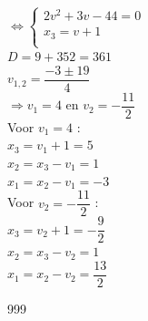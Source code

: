 \documentclass[a4paper]{article}
\begin{document}
$\Leftrightarrow \left\{
\begin{array}{l}
    2v^2 + 3v - 44 = 0 \\
	
    x_{3} = v + 1 \\
	
\end{array}
\right.$ \\

$ D = 9 + 352 = 361 $ \\

$ v_{1,2} = \dfrac{-3 \pm 19}{4} $ \\

$\Rightarrow v_{1} = 4 $ en $ v_{2} = -\dfrac{11}{2} $ \\

Voor $ v_{1} = 4 $ : \\

$ x_{3} = v_{1} + 1 = 5 $ \\

$ x_{2} = x_{3} - v_{1} =  1 $ \\

$ x_{1} = x_{2} - v_{1} = -3 $ \\

Voor $ v_{2} = -\dfrac{11}{2} $ : \\

$ x_{3} = v_{2} + 1 = -\dfrac{9}{2} $ \\

$ x_{2} = x_{3} - v_{2} =  1 $ \\

$ x_{1} = x_{2} - v_{2} = \dfrac{13}{2} $ \\



\begin{thebibliography}{999}
\end{thebibliography}
\end{document}
